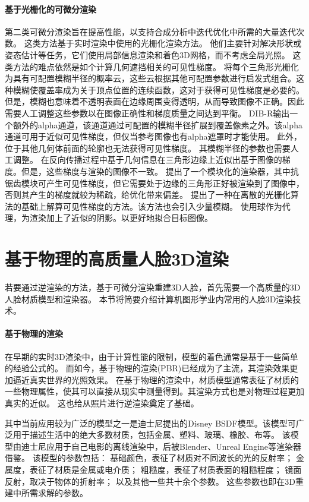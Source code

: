 \paragraph{基于光栅化的可微分渲染}
第二类可微分渲染旨在提高性能，以支持合成分析中迭代优化中所需的大量迭代次数。
这类方法基于实时渲染中使用的光栅化渲染方法。
他们主要针对解决形状或姿态估计等任务，它们使用局部信息渲染和着色3D网格，而不考虑全局光照。
这类方法的难点依然是如个计算几何遮挡相关的可见性梯度。
\citet{softras}将每个三角形光栅化为具有可配置模糊半径的概率云，这些云根据其他可配置参数进行启发式组合。这种模糊使覆盖率成为关于顶点位置的连续函数，这对于获得可见性梯度是必要的。
但是，模糊也意味着不透明表面在边缘周围变得透明，从而导致图像不正确。因此需要人工调整这些参数以在图像正确性和梯度质量之间达到平衡。
DIB-R\citep{ChenLGSLJF19}输出一个额外的alpha通道，该通道通过可配置的模糊半径扩展到覆盖像素之外。该alpha通道可用于近似可见性梯度，但仅当参考图像也有alpha遮罩时才能使用。
此外，位于其他几何体前面的轮廓也无法获得可见性梯度。
其模糊半径的参数也需要人工调整。
\citet{KatoUH18}在反向传播过程中基于几何信息在三角形边缘上近似出基于图像的梯度。但是，这些梯度与渲染的图像不一致。
\citet{nvdiffrast}提出了一个模块化的渲染器，其中抗锯齿模块可产生可见性梯度，但它需要处于边缘的三角形正好被渲染到了图像中，否则其产生的梯度就较为稀疏，给优化带来偏差。
\citet{ColeGSVZ21}提出了一种在离散的光栅化算法的基础上解算可见性梯度的方法。该方法也会引入少量模糊。
\citet{LyuHL0TT21}使用球作为代理，为渲染加上了近似的阴影。以更好地拟合目标图像。

\section{基于物理的高质量人脸3D渲染}

若要通过逆渲染的方法，基于可微分渲染重建3D人脸，首先需要一个高质量的3D人脸材质模型和渲染器。
本节将简要介绍计算机图形学业内常用的人脸3D渲染技术。

\paragraph{基于物理的渲染}

在早期的实时3D渲染中，由于计算性能的限制，模型的着色通常是基于一些简单的经验公式的。
而如今，基于物理的渲染(PBR)已经成为了主流，其渲染效果更加逼近真实世界的光照效果。
在基于物理的渲染中，材质模型通常表征了材质的一些物理属性，使其可以直接从现实中测量得到。其渲染方式也是对物理过程更加真实的近似。
这也给从照片进行逆渲染奠定了基础。

其中当前应用较为广泛的模型之一是迪士尼提出的Disney BSDF模型\citep{PBR_disney}。该模型可广泛用于描述生活中的绝大多数材质，包括金属、塑料、玻璃、橡胶、布等。
该模型由迪士尼应用于自己电影的离线渲染中，后被Blender、Unreal Engine等渲染器借鉴。
该模型的参数包括：
基础颜色，表征了材质对不同波长的光的反射率；
金属度，表征了材质是金属或电介质；
粗糙度，表征了材质表面的粗糙程度；
镜面反射，取决于物体的折射率；
以及其他一些共十余个参数。
这些参数也即在3D重建中所需求解的参数。

